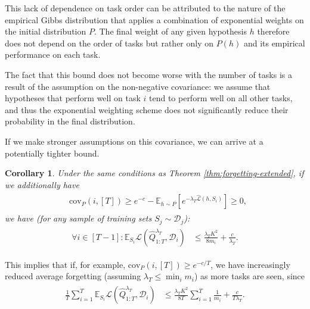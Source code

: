 \documentclass{article}
\theoremstyle{plain}
\newtheorem{corollary}[theorem]{Corollary}
\theoremstyle{definition}
\theoremstyle{remark}
\newcommand{\RM}[1]{{\textcolor{magenta}{#1}}}
\begin{document}
This lack of dependence on task order can be attributed to the nature of the empirical Gibbs distribution that applies a combination of exponential weights on the initial distribution $P$. The final weight of any given hypothesis $h$ therefore does not depend on the order of tasks but rather only on $P(h)$ and its empirical performance on each task.

The fact that this bound does not become worse with the number of tasks is a result of the assumption on the non-negative covariance: we assume that hypotheses that perform well on task $i$ tend to perform well on all other tasks, and thus the exponential weighting scheme does not significantly reduce their probability in the final distribution. 


If we make stronger assumptions on this covariance, we can arrive at a potentially tighter bound.

\begin{corollary}
\label{thm:oracle-T-highcov}
    Under the same conditions as Theorem \ref{thm:forgetting-extended}, if we additionally have
%
\begin{align*} 
\begin{split}
&\mathrm{cov}_{P}(i, [T])
  \geq e^{-c}-\mathbb{E}_{h\sim P}\left [e^{-\lambda_T\hat{\mathcal{L}}(h,S_i)} \right ] \geq 0,
\end{split}
\end{align*}
%
we have (for any sample of training sets $S_{j}\sim \mathcal{D}_j$):
%
\begin{align*} 
\begin{split}
\forall i\in[T-1]:
\mathbb{E}_{S_i}\mathcal{L}(\hat{Q}^{\lambda_T}_{1:T}, \mathcal{D}_i) &\leq \frac{\lambda_T K^2}{8m_i}+\frac{c}{\lambda_T}.
\end{split}
\end{align*}
\end{corollary}

This implies that if, for example, 
$\mathrm{cov}_{P}(i, [T])
 \geq e^{-c/T}$,
 we have increasingly reduced average forgetting (assuming $\lambda_T\leq \min_i m_i$) as more tasks are seen, since  
\begin{align*} 
\begin{split}
\frac{1}{T}\sum_{i=1}^T
\mathbb{E}_{S_i}\mathcal{L}(\hat{Q}^{\lambda_T}_{1:T}, \mathcal{D}_i) &\leq \frac{\lambda_T K^2}{8T}\sum_{i=1}^T\frac{1}{m_i}+\frac{c}{T\lambda_T}.
\end{split}
\end{align*}
\end{document}
